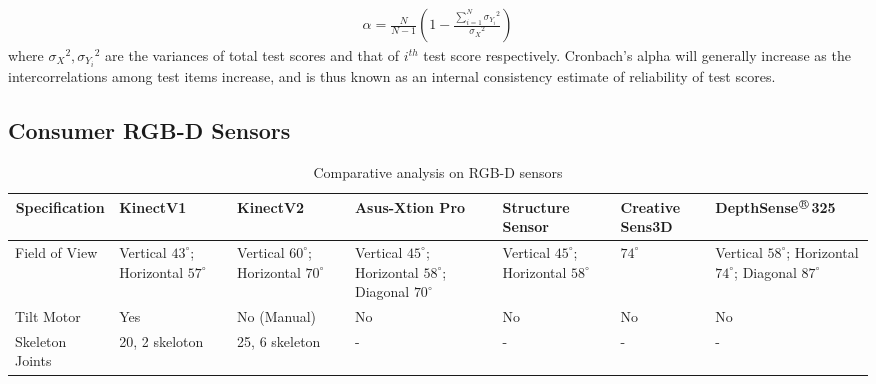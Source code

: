 \begin{enumerate}[leftmargin={0.5cm},topsep={0pt},itemsep={0pt},partopsep={0pt},parsep={0pt}]
\begin{align*}
\alpha = \frac{N}{N-1} \left( 1 - \frac{\sum_{i=1}^{N} {\sigma_{Y_i}}^2}{{\sigma_{X}}^2} \right)
\end{align*}
where ${\sigma_X}^2,{\sigma_{Y_i}}^2$ are the variances of total test scores and that of $i^{th}$ test score respectively. Cronbach's alpha will generally increase as the intercorrelations among test items increase, and is thus known as an internal consistency estimate of reliability of test scores.
\end{enumerate}

\clearpage
\begin{landscape}
\small
\section{Consumer RGB-D Sensors} %
\label{appendix:rgbd_sensors}
\centering
\begin{table}[H]
\scriptsize
\caption{Comparative analysis on RGB-D sensors}
\label{table:rgbd_sensors}
\begin{tabularx}{600pt}{c*6{X}}
\toprule
  \textbf{Specification} & \textbf{KinectV1\footnotemark[1]} 
                         & \textbf{KinectV2\footnotemark[1]} 
                         & \textbf{Asus-Xtion Pro\footnotemark[2]} 
                         & \textbf{Structure Sensor\footnotemark[3]}
                         & \textbf{Creative Sens3D\footnotemark[4]} 
                         &  \textbf{DepthSense$^{\regmark}$325\footnotemark[5]} 
  \tabularnewline \midrule
  \multicolumn{1}{l}{Field of View}       & Vertical $43^{\circ}$; Horizontal $57^{\circ}$  
                                          & Vertical $60^{\circ}$; Horizontal $70^{\circ}$ 
                                          & Vertical $45^{\circ}$; Horizontal $58^{\circ}$; Diagonal $70^{\circ}$
                                          & Vertical $45^{\circ}$; Horizontal $58^{\circ}$ 
                                          & $74^{\circ}$
                                          & Vertical $58^{\circ}$; Horizontal $74^{\circ}$; Diagonal $87^{\circ}$
                                          \tabularnewline\midrule
                                          
  \multicolumn{1}{l}{Tilt Motor}          & Yes
  										 & No (Manual)
  										 & No 
  										 & No 
  										 & No
  										 & No 
  										 \tabularnewline\midrule
  \multicolumn{1}{l}{Skeleton Joints}     & 20, 2 skeloton
  										 & 25, 6 skeleton
  										 & - 
  										 & - 
  										 & - 
  										 & - 
  										 \tabularnewline\midrule			
  		 

\end{tabularx}
\end{table}
\end{landscape}
